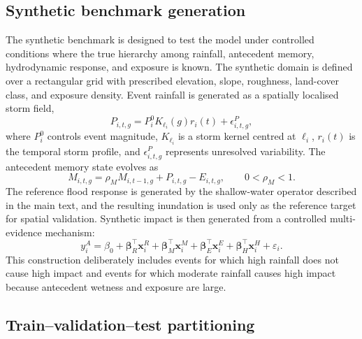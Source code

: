 \documentclass[pdflatex,sn-mathphys-ay]{sn-jnl}
\theoremstyle{thmstyleone}
\theoremstyle{thmstylethree}
\theoremstyle{thmstyletwo}
\begin{document}
\begin{appendices}
\subsection{Synthetic benchmark generation}
\label{app:synthetic_generation}

The synthetic benchmark is designed to test the model under controlled
conditions where the true hierarchy among rainfall, antecedent memory,
hydrodynamic response, and exposure is known.  The synthetic domain is
defined over a rectangular grid with prescribed elevation, slope,
roughness, land-cover class, and exposure density.  Event rainfall is
generated as a spatially localised storm field,
\begin{equation}
  P_{i,t,g}
  =
  P^{0}_{i}
  K_{\ell_i}(g)
  r_i(t)
  +
  \epsilon^{P}_{i,t,g},
  \label{eq:app_synthetic_rain}
\end{equation}
where $P^{0}_{i}$ controls event magnitude, $K_{\ell_i}$ is a storm
kernel centred at $\ell_i$, $r_i(t)$ is the temporal storm profile,
and $\epsilon^{P}_{i,t,g}$ represents unresolved variability.  The
antecedent memory state evolves as
\begin{equation}
  M_{i,t,g}
  =
  \rho_M M_{i,t-1,g}
  +
  P_{i,t,g}
  -
  E_{i,t,g},
  \qquad
  0<\rho_M<1.
  \label{eq:app_synthetic_memory}
\end{equation}
The reference flood response is generated by the shallow-water
operator described in the main text, and the resulting inundation is
used only as the reference target for spatial validation.  Synthetic
impact is then generated from a controlled multi-evidence mechanism:
\begin{equation}
  y^{A}_{i}
  =
  \beta_0
  +
  \boldsymbol{\beta}^{\top}_{R}
  \mathbf{x}^{R}_{i}
  +
  \boldsymbol{\beta}^{\top}_{M}
  \mathbf{x}^{M}_{i}
  +
  \boldsymbol{\beta}^{\top}_{E}
  \mathbf{x}^{E}_{i}
  +
  \boldsymbol{\beta}^{\top}_{H}
  \mathbf{x}^{H}_{i}
  +
  \varepsilon_i.
  \label{eq:app_synthetic_impact}
\end{equation}
This construction deliberately includes events for which high rainfall
does not cause high impact and events for which moderate rainfall
causes high impact because antecedent wetness and exposure are large.

\subsection{Train--validation--test partitioning}
\label{app:train_test_partitioning}


\end{appendices}
\end{document}
